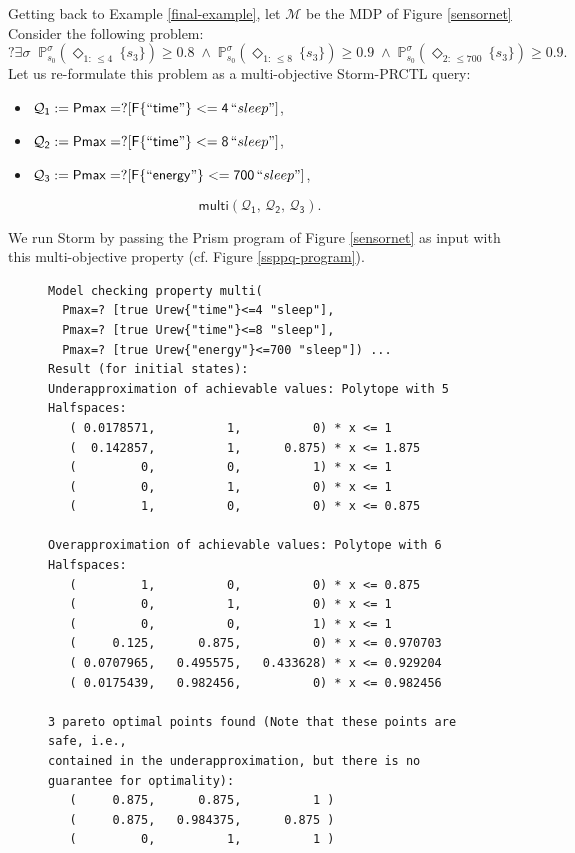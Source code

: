 \begin{example}
Getting back to Example \ref{final-example}, let $\mathcal{M}$ be the MDP of Figure \ref{sensornet}
  Consider the following \SSPPQ{} problem:
  \[
  ?\exists \sigma \;\; \mathbb{P}^{\sigma}_{s_0}(\Diamond_{1: \, \leq 4} \, \{s_3\}) \geq 0.8\; \wedge \;
   \mathbb{P}^{\sigma}_{s_0}(\Diamond_{1: \, \leq 8} \, \{s_3\}) \geq 0.9 \; \wedge \;
  \mathbb{P}_{s_0}^{\sigma}(\Diamond_{2: \, \leq 700} \, \{s_3\}) \geq 0.9.
  \]
  Let us re-formulate this problem as a multi-objective Storm-PRCTL query:
  \begin{itemize}
    \item $\mathsf{\mathcal{Q}_1 : = Pmax=?[F\{``tim
    e"\}<=4
    \,}``sleep"]$,
    \item $\mathsf{\mathcal{Q}_2 := Pmax=? [F\{``time"\}<=8 \,}
  ``sleep"]$,
    \item $\mathsf{\mathcal{Q}_3 := Pmax=? [F\{``energy"\}<=700\,}
  ``sleep"]$,
  \end{itemize}
  \[
    \mathsf{multi(\mathcal{Q}_1, \, \mathcal{Q}_2, \, \mathcal{Q}_3)}.
  \]

We run Storm by passing the Prism program of  Figure  \ref{sensornet} as input with this multi-objective property (cf. Figure \ref{ssppq-program}).
\begin{figure}[h!]
  {
  \footnotesize
  \begin{verbatim}
Model checking property multi(
  Pmax=? [true Urew{"time"}<=4 "sleep"],
  Pmax=? [true Urew{"time"}<=8 "sleep"],
  Pmax=? [true Urew{"energy"}<=700 "sleep"]) ...
Result (for initial states):
Underapproximation of achievable values: Polytope with 5 Halfspaces:
   ( 0.0178571,          1,          0) * x <= 1
   (  0.142857,          1,      0.875) * x <= 1.875
   (         0,          0,          1) * x <= 1
   (         0,          1,          0) * x <= 1
   (         1,          0,          0) * x <= 0.875

Overapproximation of achievable values: Polytope with 6 Halfspaces:
   (         1,          0,          0) * x <= 0.875
   (         0,          1,          0) * x <= 1
   (         0,          0,          1) * x <= 1
   (     0.125,      0.875,          0) * x <= 0.970703
   ( 0.0707965,   0.495575,   0.433628) * x <= 0.929204
   ( 0.0175439,   0.982456,          0) * x <= 0.982456

3 pareto optimal points found (Note that these points are safe, i.e.,
contained in the underapproximation, but there is no guarantee for optimality):
   (     0.875,      0.875,          1 )
   (     0.875,   0.984375,      0.875 )
   (         0,          1,          1 )



\end{verbatim}}
\end{figure}
\end{example}
